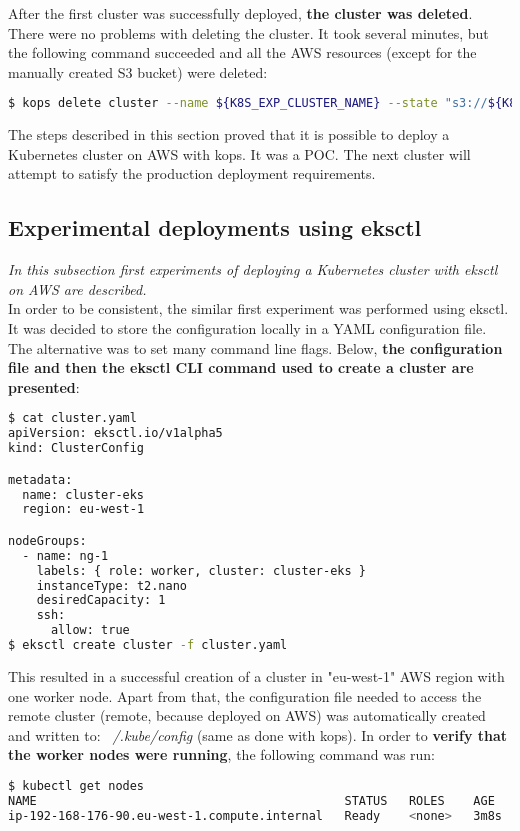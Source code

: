 After the first cluster was successfully deployed, \textbf{the cluster was deleted}. There were no problems with deleting the cluster. It took several minutes, but the following command succeeded and all the AWS resources (except for the manually created S3 bucket) were deleted:

\begin{lstlisting}[basicstyle=\tiny,caption={Command used to delete a Kubernetes cluster created with Kops},captionpos=b,language=Bash,xleftmargin=1cm]
$ kops delete cluster --name ${K8S_EXP_CLUSTER_NAME} --state "s3://${K8S_EXP_KOPS_S3_BUCKET}" --yes
\end{lstlisting}

The steps described in this section proved that it is possible to deploy a Kubernetes cluster on AWS with kops. It was a POC. The next cluster will attempt to satisfy the production deployment requirements.


\subsection{Experimental deployments using eksctl}
\textit{In this subsection first experiments of deploying a Kubernetes cluster with eksctl on AWS are described.}
\\

In order to be consistent, the similar first experiment was performed using eksctl. It was decided to store the configuration locally in a YAML configuration file. The alternative was to set many command line flags. Below, \textbf{the configuration file and then the eksctl CLI command used to create a cluster are presented}:
\begin{lstlisting}[basicstyle=\tiny,caption={Commands used to create a cluster with eksctl, without prerequisite steps performed},captionpos=b,language=Bash,xleftmargin=1cm]
$ cat cluster.yaml
apiVersion: eksctl.io/v1alpha5
kind: ClusterConfig

metadata:
  name: cluster-eks
  region: eu-west-1

nodeGroups:
  - name: ng-1
    labels: { role: worker, cluster: cluster-eks }
    instanceType: t2.nano
    desiredCapacity: 1
    ssh:
      allow: true
$ eksctl create cluster -f cluster.yaml
\end{lstlisting}

This resulted in a successful creation of a cluster in "eu-west-1" AWS region with one worker node. Apart from that, the configuration file needed to access the remote cluster (remote, because deployed on AWS) was automatically created and written to: \textit{~/.kube/config} (same as done with kops). In order to \textbf{verify that the worker nodes were running}, the following command was run:
\begin{lstlisting}[basicstyle=\tiny,caption={Command used to list Kubernetes worker nodes to verify that one such node was running},captionpos=b,language=Bash,xleftmargin=1cm]
$ kubectl get nodes
NAME                                           STATUS   ROLES    AGE    VERSION
ip-192-168-176-90.eu-west-1.compute.internal   Ready    <none>   3m8s   v1.16.8
\end{lstlisting}

